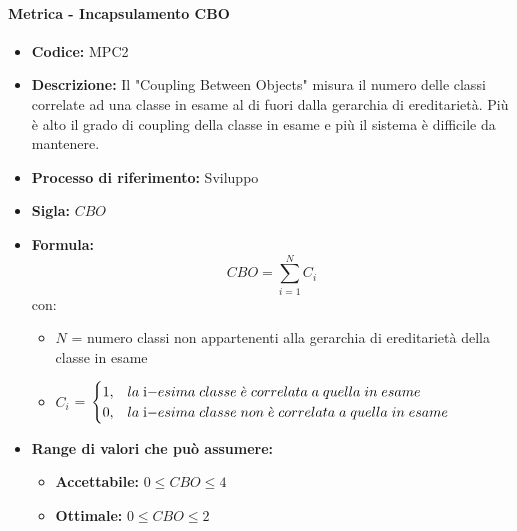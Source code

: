     \paragraph{Metrica - Incapsulamento CBO}
    \begin{itemize}
        \item \textbf{Codice:} MPC2
        \item \textbf{Descrizione:} Il "Coupling Between Objects" misura il numero delle classi correlate ad una classe in esame al di fuori dalla gerarchia di ereditarietà. Più è alto il grado di coupling della classe in esame e più il sistema è difficile da mantenere.
        \item \textbf{Processo di riferimento:} Sviluppo
        \item \textbf{Sigla:} $CBO$
        \item \textbf{Formula:} $$CBO = {\sum_{i=1}^{N} C_i}$$
        con:
        \begin{itemize}
            \item $N$ = numero classi non appartenenti alla gerarchia di ereditarietà della classe in esame
            \item $C_i$ =
            \begin{math} {
                \begin{cases}
                    1, & la \; $i$-esima \; classe \; \grave{e} \; correlata \; a \; quella \; in \; esame \\
                    0, & la \; $i$-esima \; classe \; non \; \grave{e} \; correlata \; a \; quella \; in \; esame
                \end{cases}
            }
            \end{math}
        \end{itemize}
        \item \textbf{Range di valori che può assumere:}
        \begin{itemize}
            \item \textbf{Accettabile:} $0 \leq{} CBO \leq 4$
            \item \textbf{Ottimale:} $0 \leq{} CBO \leq 2$
        \end{itemize}
    \end{itemize}

